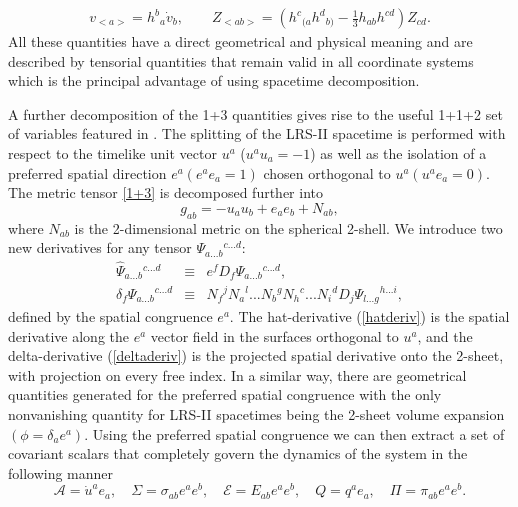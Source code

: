 \documentclass[abstract=on,notitlepage,superscriptaddress,nofootinbib,aps,preprint,prd]{revtex4}
\newcommand{\0}{^{(0)}}
\newcommand{\1}{^{(1)}}
\newcommand{\2}{^{(2)}}
\newcommand{\3}{{}^{(3)}}
\begin{document}
\begin{eqnarray}
v_{<a>} = h^{b}{}_{a}\dot{v}_{b}, \quad\quad Z_{<ab>} = \left(h^{c}{}_{(a} h^{d}{}_{b)} - \frac{1}{3}h_{ab} h^{cd}\right) Z_{cd}.
\end{eqnarray} 
All these quantities have a direct geometrical and physical meaning and are described by tensorial quantities that remain valid in all coordinate systems which is the principal advantage of using spacetime decomposition. 

A further decomposition of the 1+3 quantities gives rise to the useful 1+1+2 set of variables featured in  \cite{clarksonbarrett}. The splitting of the LRS-II spacetime is performed with respect to the timelike unit vector $u^a$ ($u^au_a = -1$) as well as the isolation of a preferred spatial direction $e^a (e^ae_a = 1)$ chosen orthogonal to $u^a (u^a e_a = 0)$. The metric tensor \eqref{1+3} is decomposed further into
\begin{equation}
g_{ab}=-u_a u_b+e_a e_b+N_{ab},
\end{equation}
where $N_{ab}$ is the 2-dimensional metric on the spherical 2-shell. We introduce two new derivatives for any tensor ${\Psi_{a...b}{}^{c...d}}$:
\begin{eqnarray}
\label{hatderiv}
\hat{\Psi}_{a...b}{}^{c...d} &\equiv& e^{f} D_{f} \Psi_{a...b}{}^{c...d}, \\
\label{deltaderiv}
\delta_{f}\Psi_{a...b}{}^{c...d} &\equiv& N_{f}{}^{j} N_{a}{}^{l} ... N_{b}{}^{g} N_{h}{}^{c} ... N_{i}{}^{d}  D_{j}\Psi_{l...g}{}^{h...i}, 
\end{eqnarray}
defined by the spatial congruence ${e^{a}}$. The hat-derivative (\ref{hatderiv}) is the spatial derivative along the ${e^{a}}$ vector field in the surfaces orthogonal to ${u^{a}}$, and the delta-derivative (\ref{deltaderiv}) is the projected spatial derivative onto the 2-sheet, with projection on every free index. In a similar way, there are geometrical quantities generated for the preferred spatial congruence with the only nonvanishing quantity for LRS-II spacetimes being the 2-sheet volume expansion $(\phi = \delta_a e^a)$. Using the preferred spatial congruence we can then extract a set of covariant scalars that completely govern the dynamics of the system in the following manner
\begin{equation}
\mathcal{A} = \dot{u}^a e_a, \quad \Sigma = \sigma_{ab}e^a e^b, \quad \mathcal{E} = E_{ab}e^a e^b, \quad Q = q^a e_a, \quad \Pi = \pi_{ab}e^a e^b.
\end{equation}
\end{document}
